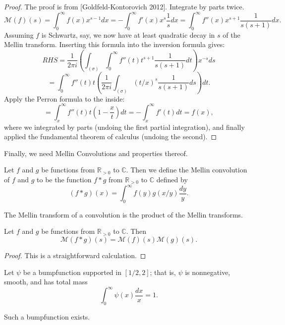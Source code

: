 \begin{proof}
The proof is from [Goldfeld-Kontorovich 2012].
Integrate by parts twice.
$$
\mathcal{M}(f)(s) = \int_0^\infty f(x)x^{s-1}dx = - \int_0^\infty f'(x)x^s\frac{1}{s}dx = \int_0^\infty f''(x)x^{s+1}\frac{1}{s(s+1)}dx.
$$
Assuming $f$ is Schwartz, say, we now have at least quadratic decay in $s$ of the Mellin transform. Inserting this formula into the inversion formula gives:
$$
RHS = \frac{1}{2\pi i}\left(\int_{(σ)}\int_0^\infty f''(t)t^{s+1}\frac{1}{s(s+1)}dt\right) x^{-s}ds
$$
$$
= \int_0^\infty f''(t) t \left( \frac{1}{2\pi i}\int_{(σ)}(t/x)^s\frac{1}{s(s+1)}ds\right) dt.
$$
Apply the Perron formula to the inside:
$$
= \int_x^\infty f''(t) t \left(1-\frac{x}{t}\right)dt
= -\int_x^\infty f'(t) dt
= f(x),
$$
where we integrated by parts (undoing the first partial integration), and finally applied the fundamental theorem of calculus (undoing the second).
\end{proof}



Finally, we need Mellin Convolutions and properties thereof.
\begin{definition}\label{MellinConvolution}
Let $f$ and $g$ be functions from $\mathbb{R}_{>0}$ to $\mathbb{C}$. Then we define the Mellin convolution of $f$ and $g$ to be the function $f\ast g$ from $\mathbb{R}_{>0}$ to $\mathbb{C}$ defined by
$$(f\ast g)(x) = \int_0^\infty f(y)g(x/y)\frac{dy}{y}.$$
\end{definition}



The Mellin transform of a convolution is the product of the Mellin transforms.
\begin{theorem}\label{MellinConvolutionTransform}
Let $f$ and $g$ be functions from $\mathbb{R}_{>0}$ to $\mathbb{C}$. Then
$$\mathcal{M}(f\ast g)(s) = \mathcal{M}(f)(s)\mathcal{M}(g)(s).$$
\end{theorem}



\begin{proof}
This is a straightforward calculation.
\end{proof}



Let $\psi$ be a bumpfunction supported in $[1/2,2]$; that is, $\psi$ is nonnegative, smooth, and has total mass
$$
\int_0^\infty \psi(x)\frac{dx}{x} = 1.
$$
\begin{theorem}\label{SmoothExistence}
Such a bumpfunction exists.
\end{theorem}




